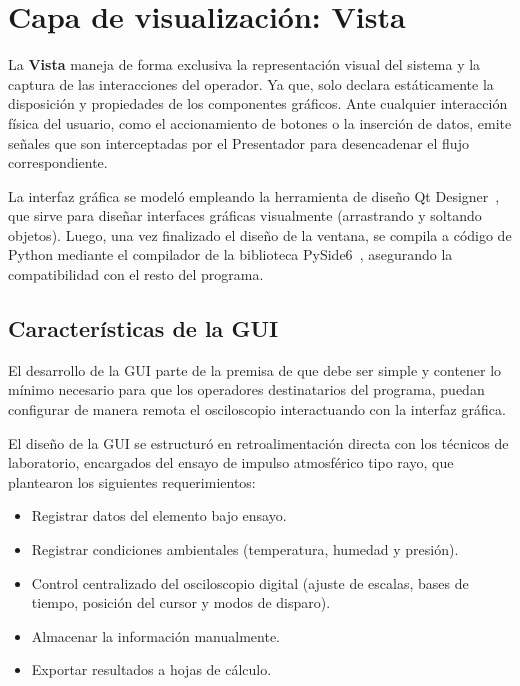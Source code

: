 \section{Capa de visualización: Vista}
\label{sec:capa_vista}
\vspace{3\baselineskip}

La \textbf{Vista} maneja de forma exclusiva la representación visual del sistema y la captura de las interacciones del operador. Ya que, solo declara estáticamente la disposición y propiedades de los componentes gráficos. Ante cualquier interacción física del usuario, como el accionamiento de botones o la inserción de datos, emite señales que son interceptadas por el Presentador para desencadenar el flujo correspondiente.

La interfaz gráfica se modeló empleando la herramienta de diseño Qt Designer~\cite{qt_designer}, que sirve para diseñar interfaces gráficas visualmente (arrastrando y soltando objetos). Luego, una vez finalizado el diseño de la ventana, se compila a código de Python mediante el compilador de la biblioteca PySide6~\cite{pyside6}, asegurando la compatibilidad con el resto del programa.

\subsection{Características de la GUI}
\label{sec:caracteristicas_gui}

El desarrollo de la GUI parte de la premisa de que debe ser simple y contener lo mínimo necesario para que los operadores destinatarios del programa, puedan configurar de manera remota el osciloscopio interactuando con la interfaz gráfica.

El diseño de la GUI se estructuró en retroalimentación directa con los técnicos de laboratorio, encargados del ensayo de impulso atmosférico tipo rayo, que plantearon los siguientes requerimientos:

\begin{itemize}
    \item Registrar datos del elemento bajo ensayo.
    \item Registrar condiciones ambientales (temperatura, humedad y presión).
    \item Control centralizado del osciloscopio digital (ajuste de escalas, bases de tiempo, posición del cursor y modos de disparo).
    \item Almacenar la información manualmente.
    \item Exportar resultados a hojas de cálculo.
\end{itemize}

